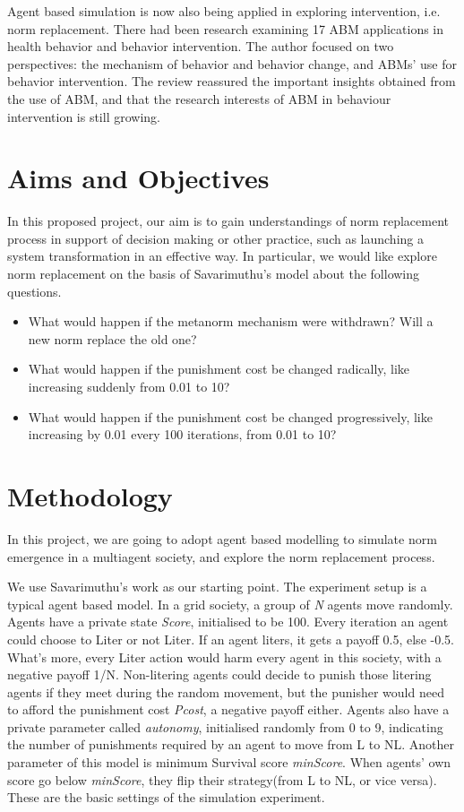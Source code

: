 \documentclass[12pt]{extarticle}
\begin{document}
Agent based simulation is now also being applied in exploring intervention, i.e. norm replacement. There had been research\cite{Yang2019} examining 17 ABM applications in health behavior and behavior intervention. The author focused on two perspectives: the mechanism of behavior and behavior change, and ABMs' use for behavior intervention. The review reassured the important insights obtained from the use of ABM, and that the research interests of ABM in behaviour intervention is still growing.


\section{Aims and Objectives}
In this proposed project, our aim is to gain understandings of norm replacement process in support of decision making or other practice, such as launching a system transformation in an effective way. In particular, we would like explore norm replacement on the basis of Savarimuthu's model\cite{Savarimuthu2008} about the following questions. 

\begin{itemize}
\item What would happen if the metanorm mechanism were withdrawn? Will a new norm replace the old one?
\item What would happen if the punishment cost be changed radically, like increasing suddenly from 0.01 to 10?
\item What would happen if the punishment cost be changed progressively, like increasing by 0.01 every 100 iterations, from 0.01 to 10? 
\end{itemize}

\section{Methodology}
In this project, we are going to adopt agent based modelling to simulate norm emergence in a multiagent society, and explore the norm replacement process.

We use Savarimuthu's work\cite{Savarimuthu2008} as our starting point. The experiment setup is a typical agent based model. In a grid society, a group of \textit{N} agents move randomly. Agents have a private state \textit{Score}, initialised to be 100. Every iteration an agent could choose to Liter or not Liter. If an agent liters, it gets a payoff 0.5, else -0.5. What's more, every Liter action would harm every agent in this society, with a negative payoff 1/N. Non-litering agents could decide to punish those litering agents if they meet during the random movement, but the punisher would need to afford the punishment cost \textit{Pcost}, a negative payoff either. Agents also have a private parameter called \textit{autonomy}, initialised randomly from 0 to 9, indicating the number of punishments required by an agent to move from L to NL. Another parameter of this model is minimum Survival score \textit{minScore}. When agents' own score go below \textit{minScore}, they flip their strategy(from L to NL, or vice versa). These are the basic settings of the simulation experiment.
\end{document}
